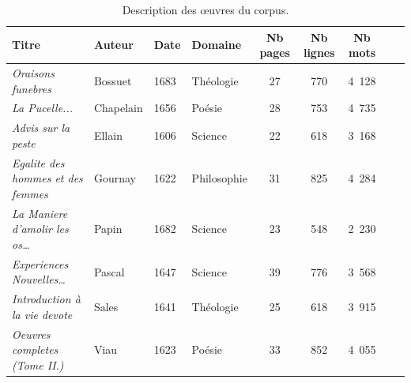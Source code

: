 \documentclass[10pt,twoside]{article}
\begin{document}
        \begin{table}[h]
        \begin{center}
        \begin{tabular}{|l|l|l|l|c|c|c|c|c|}
        \hline
        \textbf{{\footnotesize Titre}}&\textbf{{\footnotesize Auteur}}&\textbf{{\footnotesize Date}}&\textbf{{\footnotesize Domaine}}&\textbf{{\footnotesize Nb pages}}&\textbf{{\footnotesize Nb lignes}}&\textbf{{\footnotesize Nb mots}}\\
        \hline
        \textit{{\footnotesize Oraisons funebres}}&{\footnotesize Bossuet}&{\footnotesize 1683}&{\footnotesize Théologie}&{\footnotesize 27}&{\footnotesize 770}&{\footnotesize 4~128}\\ \hline
        \textit{{\footnotesize La Pucelle...}}&{\footnotesize Chapelain}&{\footnotesize 1656}&{\footnotesize Poésie}&{\footnotesize 28}&{\footnotesize 753}&{\footnotesize 4~735}\\ \hline
        \textit{{\footnotesize Advis sur la peste}}&{\footnotesize Ellain}&{\footnotesize 1606}&{\footnotesize Science}&{\footnotesize 22}&{\footnotesize 618}&{\footnotesize 3~168}\\ \hline
        \textit{{\footnotesize Egalite des hommes et des femmes}}&{\footnotesize Gournay}&{\footnotesize 1622}&{\footnotesize Philosophie}&{\footnotesize 31}&{\footnotesize 825}&{\footnotesize 4~284}\\ \hline
        \textit{{\footnotesize La Maniere d’amolir les os…}}&{\footnotesize Papin}&{\footnotesize 1682}&{\footnotesize Science}&{\footnotesize 23}&{\footnotesize 548}&{\footnotesize 2~230}\\ \hline
        \textit{{\footnotesize Experiences Nouvelles…}}&{\footnotesize Pascal}&{\footnotesize 1647}&{\footnotesize Science}&{\footnotesize 39}&{\footnotesize 776}&{\footnotesize 3~568}\\ \hline
        \textit{{\footnotesize Introduction à la vie devote}}&{\footnotesize Sales}&{\footnotesize 1641}&{\footnotesize Théologie}&{\footnotesize 25}&{\footnotesize 618}&{\footnotesize 3~915}\\ \hline
        \textit{{\footnotesize Oeuvres completes (Tome II.)}}&{\footnotesize Viau}&{\footnotesize 1623}&{\footnotesize Poésie}&{\footnotesize 33}&{\footnotesize 852}&{\footnotesize 4~055}\\ \hline
        \end{tabular}
        \caption{Description des \oe{}uvres du corpus.} \label{tab:corpus}
        \end{center}
        \end{table} 
\end{document}
